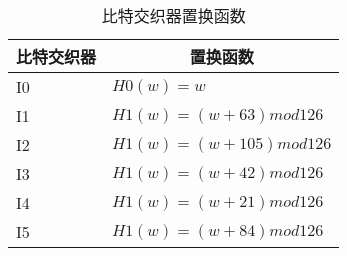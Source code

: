 \begin{table}[!htbp]
	\centering
	\caption{比特交织器置换函数}
	\begin{tabular}{|l|l|}
	\hline
	\multicolumn{1}{|c|}{比特交织器} & \multicolumn{1}{|c|}{置换函数} \\
	\hline
	I0 & $H0(w)=w$ \\
	\hline
	I1 & $H1(w)=(w+63) mod 126$ \\
	\hline
	I2 & $H1(w)=(w+105) mod 126$ \\
	\hline
	I3 & $H1(w)=(w+42) mod 126$ \\
	\hline
	I4 & $H1(w)=(w+21) mod 126$ \\
	\hline
	I5 & $H1(w)=(w+84) mod 126$ \\
	\hline
	\end{tabular}
	\label{table:inner_interleaver_hew}
\end{table}

\endinput